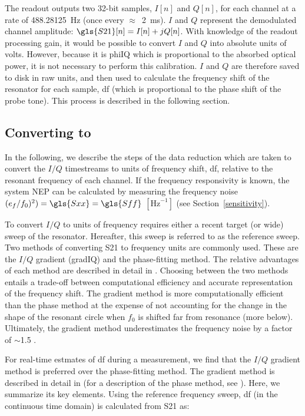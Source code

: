 The readout outputs two 32-bit samples, $I[n]$ and $Q[n]$, for each channel at a rate of 488.28125~Hz (once every $\approx$~2~ms). $I$ and $Q$ represent the demodulated channel amplitude: $\gls{S21}[n] = I[n] +jQ[n] $. With knowledge of the readout processing gain, it would be possible to convert $I$ and $Q$ into absolute units of volts. However, because it is \gls{phiIQ} which is proportional to the absorbed optical power, it is not necessary to perform this calibration. $I$ and $Q$ are therefore saved to disk in raw units, and then used to calculate the frequency shift of the resonator for each sample, \gls{df} (which is proportional to the phase shift of the probe tone). This process is described in the following section.

\subsection{Converting  to }\label{df calc}

In the following, we describe the steps of the data reduction which are taken to convert the $I/Q$ timestreams to units of frequency shift, \gls{df}, relative to the resonant frequency of each channel. If the frequency responsivity is known, the system NEP can be calculated by measuring the frequency noise $(e_{f}/f_{0})^{2}) = \gls{Sxx} = \gls{Sff}$ $[\mathrm{Hz}^{-1}]$ (see Section~\ref{sensitivity}).

To convert $I/Q$ to units of frequency requires either a recent target (or wide) sweep of the resonator. Hereafter, this sweep is referred to as the reference sweep. Two methods of converting \gls{S21} to frequency units are commonly used. These are the $I/Q$ gradient (\gls{gradIQ}) and the phase-fitting method. The relative advantages of each method are described in detail in \citet{barry2014development}. Choosing between the two methods entails a trade-off between computational efficiency and accurate representation of the frequency shift. The gradient method is more computationally efficient than the phase method at the expense of not accounting for the change in the shape of the resonant circle when $f_{0}$ is shifted far from resonance (more below). Ultimately, the gradient method underestimates the frequency noise by a factor of $\sim$1.5 \citep{barry2014development}.

For real-time estmates of \gls{df} during a measurement, we find that the $I/Q$ gradient method is preferred over the phase-fitting method. The gradient method is described in detail in \citet{d2013nika} (for a description of the phase method, see \citet{gao2008physics}). Here, we summarize its key elements. Using the reference frequency sweep, \gls{df} (in the continuous time domain) is calculated from \gls{S21} as:

